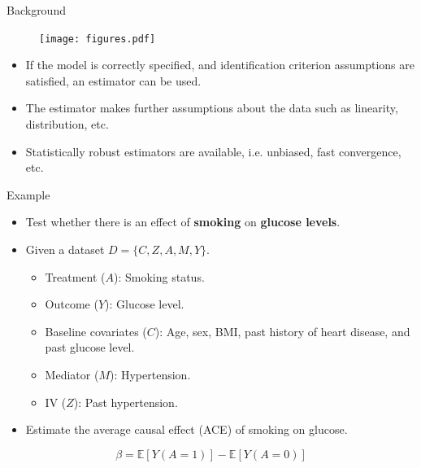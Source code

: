 \documentclass{beamer}
\begin{document}
\begin{frame}{Background}
	\begin{figure}
		\center
		\texttt{[image: figures.pdf]}
	\end{figure}
	\vspace{1em}
	\begin{itemize}
		\item If the model is correctly specified, and identification criterion assumptions are satisfied, an estimator can be used.
		\item The estimator makes further assumptions about the data such as linearity, distribution, etc.
		\item Statistically robust estimators are available, i.e. unbiased, fast convergence, etc.
	\end{itemize}
\end{frame}

\begin{frame}{Example}
	\begin{itemize}
		\item Test whether there is an effect of \textbf{smoking} on \textbf{glucose levels}.
		\item Given a dataset $ D = \{ C, Z, A, M, Y \} $.
			\begin{itemize}
				\item Treatment ($ A $): Smoking status.
				\item Outcome ($ Y $): Glucose level.
				\item Baseline covariates ($ C $): Age, sex, BMI, past history of heart disease, and past glucose level.
				\item Mediator ($ M $): Hypertension.
				\item IV ($ Z $): Past hypertension.
			\end{itemize}
		\item Estimate the average causal effect (ACE) of smoking on glucose.
	\end{itemize}
			$$ \beta = \mathbb{E}[Y(A=1)] - \mathbb{E}[Y(A=0)] $$
\end{frame}
\end{document}
